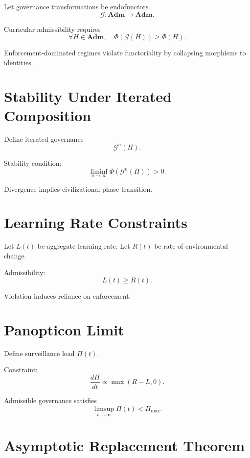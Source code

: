 \documentclass[12pt,oneside]{book}
\begin{document}
Let governance transformations be endofunctors
\[
\mathcal{G} : \mathbf{Adm} \to \mathbf{Adm}.
\]

Curricular admissibility requires
\begin{equation}
\forall H \in \mathbf{Adm},
\quad
\Phi(\mathcal{G}(H)) \ge \Phi(H).
\end{equation}

Enforcement-dominated regimes violate functoriality
by collapsing morphisms to identities.

\chapter{Stability Under Iterated Composition}

Define iterated governance
\[
\mathcal{G}^n(H).
\]

Stability condition:
\begin{equation}
\liminf_{n\to\infty}
\Phi(\mathcal{G}^n(H)) > 0.
\end{equation}

Divergence implies civilizational phase transition.

\chapter{Learning Rate Constraints}

Let \(L(t)\) be aggregate learning rate.
Let \(R(t)\) be rate of environmental change.

Admissibility:
\begin{equation}
L(t) \ge R(t).
\end{equation}

Violation induces reliance on enforcement.

\chapter{Panopticon Limit}

Define surveillance load \(\Pi(t)\).

Constraint:
\begin{equation}
\frac{d\Pi}{dt} \propto \max(R-L,0).
\end{equation}

Admissible governance satisfies
\begin{equation}
\limsup_{t\to\infty} \Pi(t) < \Pi_{\max}.
\end{equation}

\chapter{Asymptotic Replacement Theorem}
\end{document}
